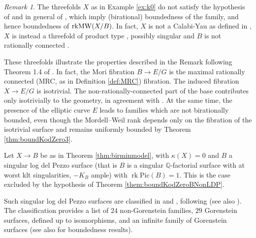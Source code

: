 \documentclass[11pt]{amsart}
\theoremstyle{definition}
\theoremstyle{definition}
\theoremstyle{remark}
\newtheorem{remark}[theorem]{Remark}
\theoremstyle{remark}
\theoremstyle{definition}
\theoremstyle{conjecture}
\newcommand{\MW}{\mathrm{MW}}
\newcommand{\Pic}{\mathrm{Pic}}
\begin{document}
 
\begin{remark}\label{remark:producttype}   The threefolds  $X$ as in Example \ref{ex:k0} do not satisfy the hypothesis of \cite{DiCerboSvaldi, Filipazzi:2021dcw} and in general of \cite{Birkar_2024},  which  imply (birational) boundedness of  the family, and hence boundedness of ${\rm rk}{\MW}(X/B)$.
 In fact, $X$ is not a Calabi-Yau as defined in \cite{Filipazzi:2021dcw},  $X$ is  instead a threefold of product type \cite{DiCerboSvaldi}, possibly singular and  $B$ is not rationally connected \cite{Birkar_2024}.
 

 These threefolds illustrate the properties described in the  Remark following Theorem 1.4 of \cite{Birkar_2024}. In fact, the Mori fibration  
$B \to E/G$ is the maximal rationally connected (MRC, as in Definition \ref{def:MRC}) fibration. The induced fibration 
$X \to E/G$ is isotrivial.
The non-rationally-connected part of the base contributes only isotrivially to the geometry, in agreement with \cite{Birkar_2024}. 
At the same time, the presence of the elliptic  curve $E$ leads to families which are not birationally bounded, even though the Mordell{--}Weil rank depends only on the fibration of the isotrivial surface and remains uniformly bounded by Theorem \ref{thm:boundKodZero3}.
\end{remark}


\medskip

  Let $X \to B$  be as in Theorem \ref{thm:birminmodel}, with $\kappa(X)=0$ and  %
 $B$  a  singular log del Pezzo surface (that is  $B$ is a  singular $\mathbb{Q}$-factorial surface with at worst klt singularities,  $-K_B$ ample)  with $\operatorname{rk}{\Pic}(B)=1$. This is  the case excluded  by the hypothesis of  Theorem \ref{them:boundKodZeroBNonLDP}.

 
 Such singular  log del Pezzo surfaces %
 are classified in \cite{YeGorLogDelPezzo}  and \cite{Lacini2024}, following \cite{KeelMcKernan1999} (see also \cite{Nagaoka2025reviewlacinisclassificationrank}).
 The classification provides a list of  $24$ non-Gorenstein families,  %
 $29$ Gorenstein surfaces, defined  up to isomorphisms, and an infinite family of  Gorenstein surfaces %
 \cite{YeGorLogDelPezzo} (see also \cite{Alexeev1994} for boundedness results).
\end{document}
